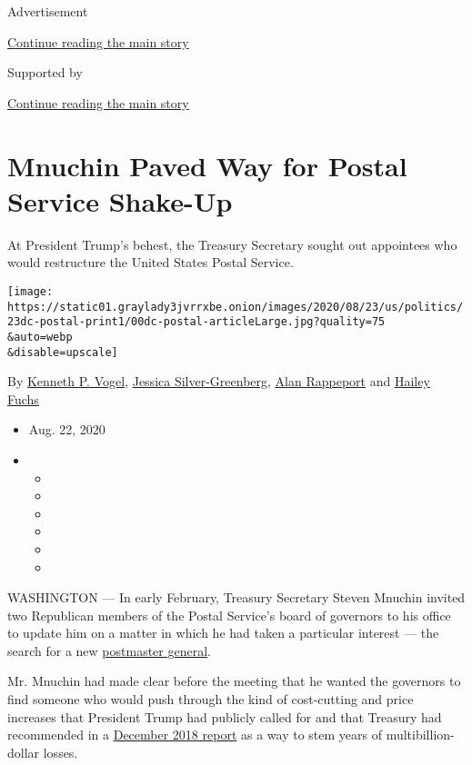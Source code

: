 Advertisement

\protect\hyperlink{after-top}{Continue reading the main story}

Supported by

\protect\hyperlink{after-sponsor}{Continue reading the main story}

\hypertarget{mnuchin-paved-way-for-postal-service-shake-up}{%
\section{Mnuchin Paved Way for Postal Service
Shake-Up}\label{mnuchin-paved-way-for-postal-service-shake-up}}

At President Trump's behest, the Treasury Secretary sought out
appointees who would restructure the United States Postal Service.

\texttt{[image: https://static01.graylady3jvrrxbe.onion/images/2020/08/23/us/politics/23dc-postal-print1/00dc-postal-articleLarge.jpg?quality=75\\\&auto=webp\\\&disable=upscale]}

By \href{https://www.nytimes3xbfgragh.onion/by/kenneth-p-vogel}{Kenneth
P. Vogel},
\href{https://www.nytimes3xbfgragh.onion/by/jessica-silver-greenberg}{Jessica
Silver-Greenberg},
\href{https://www.nytimes3xbfgragh.onion/by/alan-rappeport}{Alan
Rappeport} and
\href{https://www.nytimes3xbfgragh.onion/by/hailey-fuchs}{Hailey Fuchs}

\begin{itemize}
\item
  Aug. 22, 2020
\item
  \begin{itemize}
  \item
  \item
  \item
  \item
  \item
  \item
  \end{itemize}
\end{itemize}

WASHINGTON --- In early February, Treasury Secretary Steven Mnuchin
invited two Republican members of the Postal Service's board of
governors to his office to update him on a matter in which he had taken
a particular interest --- the search for a new
\href{https://www.nytimes3xbfgragh.onion/2020/08/24/us/politics/postal-service-dejoy-testimony.html}{postmaster
general}.

Mr. Mnuchin had made clear before the meeting that he wanted the
governors to find someone who would push through the kind of
cost-cutting and price increases that President Trump had publicly
called for and that Treasury had recommended in a
\href{https://home.treasury.gov/news/press-releases/sm566}{December 2018
report} as a way to stem years of multibillion-dollar losses.

